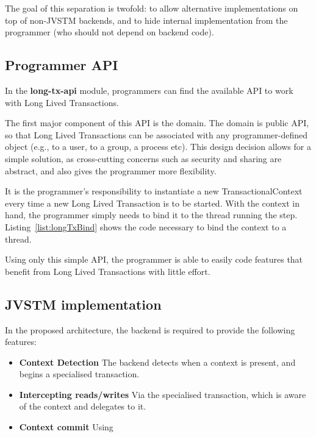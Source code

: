 The goal of this separation is twofold: to allow alternative
implementations on top of non-JVSTM backends, and to hide internal
implementation from the programmer (who should not depend on backend
code).

\subsection{Programmer API}

In the {\bf long-tx-api} module, programmers can find the available
API to work with Long Lived Transactions.

The first major component of this API is the domain. The domain is
public API, so that Long Lived Transactions can be associated with any
programmer-defined object (e.g., to a user, to a group, a process
etc). This design decision allows for a simple solution, as
cross-cutting concerns such as security and sharing are abstract, and
also gives the programmer more flexibility.

It is the programmer's responsibility to instantiate a new
TransactionalContext every time a new Long Lived Transaction is to be
started. With the context in hand, the programmer simply needs to bind
it to the thread running the step. Listing~\ref{list:longTxBind} shows
the code necessary to bind the context to a thread.

Using only this simple API, the programmer is able to easily code
features that benefit from Long Lived Transactions with little effort.

\subsection{JVSTM implementation}

In the proposed architecture, the backend is required to provide the
following features:

\begin{itemize}

\item {\bf Context Detection} The backend detects when a context is
  present, and begins a specialised transaction.

\item {\bf Intercepting reads/writes} Via the specialised transaction,
  which is aware of the context and delegates to it.

\item {\bf Context commit} Using 

\end{itemize}

